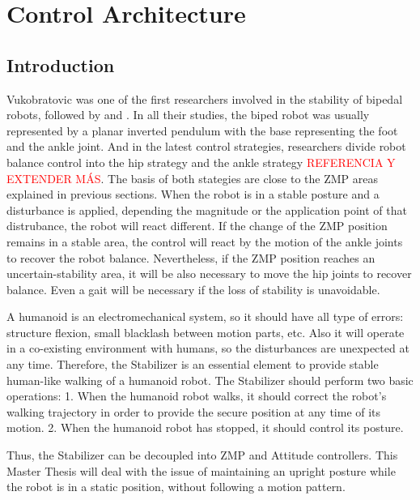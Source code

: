 \chapter{Control Architecture}
\section{Introduction}
Vukobratovic \cite{Vuk1970} was one of the first researchers involved in the stability of bipedal robots, followed by \cite{Kaj2001} and \cite{Kim2004}. In all their studies, the biped robot was usually represented by a planar inverted pendulum with the base representing the foot and the ankle joint. And in the latest control strategies, researchers divide robot balance control into the hip strategy and the ankle strategy \textcolor{red}{REFERENCIA Y EXTENDER MÁS}. The basis of both stategies are close to the ZMP areas explained in previous sections. When the robot is in a stable posture and a disturbance is applied, depending the magnitude or the application point of that distrubance, the robot will react different. If the change of the ZMP position remains in a stable area, the control will react by the motion of the ankle joints to recover the robot balance. Nevertheless, if the ZMP position reaches an uncertain-stability area, it will be also necessary to move the hip joints to recover balance. Even a gait will be necessary if the loss of stability is unavoidable. 

A humanoid is an electromechanical system, so it should have all type of errors: structure flexion, small blacklash between motion parts, etc. Also it will operate in a co-existing environment with humans, so the disturbances are unexpected at any time. Therefore, the Stabilizer is an essential element to provide stable human-like walking of a humanoid robot. The Stabilizer should perform two basic operations:
1. When the humanoid robot walks, it should correct the robot’s walking trajectory in order to provide the secure position at any time of its motion.
2. When the humanoid robot has stopped, it should control its posture.

Thus, the Stabilizer can be decoupled into ZMP and Attitude controllers. This Master Thesis will deal with the issue of maintaining an upright posture while the robot is in a static position, without following a motion pattern.







